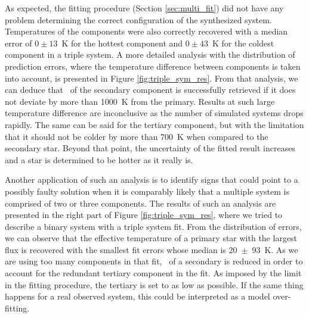 As expected, the fitting procedure (Section \ref{sec:multi_fit}) did not have any problem determining the correct configuration of the synthesized system. Temperatures of the components were also correctly recovered with a median error of $0 \pm 13$~K for the hottest component and  $0 \pm 43$~K for the coldest component in a triple system. A more detailed analysis with the distribution of prediction errors, where the temperature difference between components is taken into account, is presented in Figure \ref{fig:triple_sym_res}. From that analysis, we can deduce that \Teff\ of the secondary component is successfully retrieved if it does not deviate by more than 1000~K from the primary. Results at such large temperature difference are inconclusive as the number of simulated systems drops rapidly. The same can be said for the tertiary component, but with the limitation that it should not be colder by more than 700~K when compared to the secondary star. Beyond that point, the uncertainty of the fitted result increases and a star is determined to be hotter as it really is.

Another application of such an analysis is to identify signs that could point to a possibly faulty solution when it is comparably likely that a multiple system is comprised of two or three components. The results of such an analysis are presented in the right part of Figure \ref{fig:triple_sym_res}, where we tried to describe a binary system with a triple system fit. From the distribution of errors, we can observe that the effective temperature of a primary star with the largest flux is recovered with the smallest fit errors whose median is $20$~$\pm$~$93$~K. As we are using too many components in that fit, \Teff\ of a secondary is reduced in order to account for the redundant tertiary component in the fit. As imposed by the limit in the fitting procedure, the tertiary  is set to as low as possible. If the same thing happens for a real observed system, this could be interpreted as a model over-fitting.

